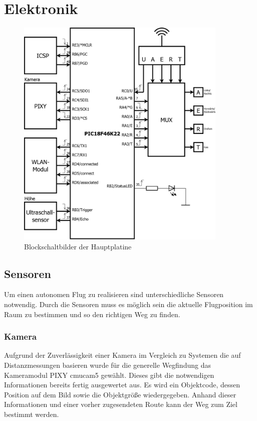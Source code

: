 \chapter{Elektronik}

\renewcommand{\kapitelautor}{Autor: Lucas Ullrich}

\begin{figure}[tbh]
\begin{centering}
\includegraphics[width = 0.9\textwidth]{Bilder/Blockbild}
\par\end{centering}
\caption{Blockschaltbilder der Hauptplatine}
\label{Blockschaltbild}
\end{figure}

\needspace{3cm}
\section{Sensoren}
Um einen autonomen Flug zu realisieren sind unterschiedliche Sensoren notwendig.
Durch die Sensoren muss es möglich sein die aktuelle Flugposition im Raum zu bestimmen und so den richtigen Weg zu finden.

\subsection{Kamera}
Aufgrund der Zuverlässigkeit einer Kamera im Vergleich zu Systemen die auf Distanzmessungen basieren wurde für die generelle Wegfindung das Kameramodul PIXY cmucam5 gewählt. Dieses gibt die notwendigen Informationen bereits fertig ausgewertet aus. Es wird ein Objektcode, dessen Position auf dem Bild sowie die Objektgröße wiedergegeben.
Anhand dieser Informationen und einer vorher zugesendeten Route kann der Weg zum Ziel bestimmt werden.

